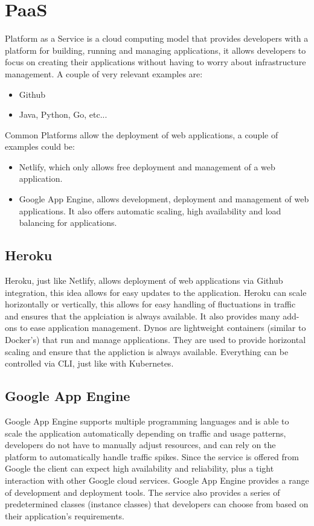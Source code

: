 \chapter{PaaS}
Platform as a Service is a cloud computing model that provides developers with a platform for building, running and managing applications, it allows developers to focus on creating their applications without having to worry about infrastructure management. \n
A couple of very relevant examples are:
\begin{itemize}
    \item Github
    \item Java, Python, Go, etc...
\end{itemize}
Common Platforms allow the deployment of web applications, a couple of examples could be:
\begin{itemize}
    \item Netlify, which only allows free deployment and management of a web application.
    \item Google App Engine, allows development, deployment and management of web applications. It also offers automatic scaling, high availability and load balancing for applications.
\end{itemize}
\section{Heroku}
Heroku, just like Netlify, allows deployment of web applications via Github integration, this idea allows for easy updates to the application. \n
Heroku can scale horizontally or vertically, this allows for easy handling of fluctuations in traffic and ensures that the applciation is always available. It also provides many add-ons to ease application management. \n
Dynos are lightweight containers (similar to Docker's) that run and manage applications. They are used to provide horizontal scaling and ensure that the appliction is always available. Everything can be controlled via CLI, just like with Kubernetes.
\section{Google App Engine}
Google App Engine supports multiple programming languages and is able to scale the application automatically depending on traffic and usage patterns, developers do not have to manually adjust resources, and can rely on the platform to automatically handle traffic spikes. \n
Since the service is offered from Google the client can expect high availability and reliability, plus a tight interaction with other Google cloud services. \n
Google App Engine provides a range of development and deployment tools. \n
The service also provides a series of predetermined classes (instance classes) that developers can choose from based on their application's requirements.
